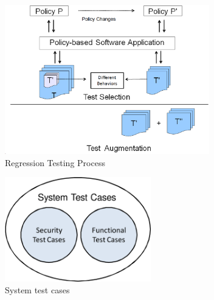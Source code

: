 %
%
\begin{figure}[t]
    \centering
        \includegraphics[width=3.5in]{regressiontesting.eps}
       \vspace{-4pt}
    \caption{\label{fig:process}Regression Testing Process}
   \vspace{-10pt}
\end{figure}
\begin{figure}[t]
    \centering
    \vspace{+5pt}
        \includegraphics[width=2.5in]{systemtestcases.eps}
       \vspace{-4pt}
    \caption{\label{fig:systemtestcases}System test cases}
   \vspace{-10pt}
    \vspace{+3pt}
\end{figure}

